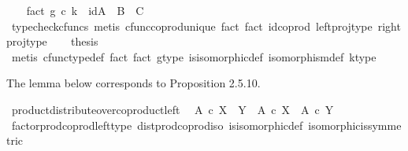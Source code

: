 \begin{isabellebody}
\ \ \isamarkupfalse%
\ fact{}{\isacharcolon}{\kern0pt}\ {\isachardoublequoteopen}{\isacharparenleft}{\kern0pt}g\ {\isasymcirc}\isactrlsub c\ k{\isacharparenright}{\kern0pt}\ {\isacharequal}{\kern0pt}\ id{\isacharparenleft}{\kern0pt}{\isacharparenleft}{\kern0pt}A\ {\isasymCoprod}\ B{\isacharparenright}{\kern0pt}\ {\isasymCoprod}\ C{\isacharparenright}{\kern0pt}{\isachardoublequoteclose}\isanewline
\ \ \ \ \isamarkupfalse%
\ {\isacharparenleft}{\kern0pt}typecheck{\isacharunderscore}{\kern0pt}cfuncs{\isacharcomma}{\kern0pt}\ metis\ cfunc{\isacharunderscore}{\kern0pt}coprod{\isacharunderscore}{\kern0pt}unique\ fact{}\ fact{}\ id{\isacharunderscore}{\kern0pt}coprod\ left{\isacharunderscore}{\kern0pt}proj{\isacharunderscore}{\kern0pt}type\ right{\isacharunderscore}{\kern0pt}proj{\isacharunderscore}{\kern0pt}type{\isacharparenright}{\kern0pt}\isanewline
\ \ \isamarkupfalse%
\ {\isacharquery}{\kern0pt}thesis\isanewline
\ \ \ \ \isamarkupfalse%
\ {\isacharparenleft}{\kern0pt}metis\ cfunc{\isacharunderscore}{\kern0pt}type{\isacharunderscore}{\kern0pt}def\ fact{}\ fact{}\ g{\isacharunderscore}{\kern0pt}type\ is{\isacharunderscore}{\kern0pt}isomorphic{\isacharunderscore}{\kern0pt}def\ isomorphism{\isacharunderscore}{\kern0pt}def\ k{\isacharunderscore}{\kern0pt}type{\isacharparenright}{\kern0pt}\isanewline
{}\isamarkupfalse%
%
\endisatagproof
{\isafoldproof}%
%
\isadelimproof
%
\endisadelimproof
%
\begin{isamarkuptext}%
The lemma below corresponds to Proposition 2.5.10.%
\end{isamarkuptext}\isamarkuptrue%
\isamarkupfalse%
\ product{\isacharunderscore}{\kern0pt}distribute{\isacharunderscore}{\kern0pt}over{\isacharunderscore}{\kern0pt}coproduct{\isacharunderscore}{\kern0pt}left{\isacharcolon}{\kern0pt}\isanewline
\ \ {\isachardoublequoteopen}A\ {\isasymtimes}\isactrlsub c\ {\isacharparenleft}{\kern0pt}X\ {\isasymCoprod}\ Y{\isacharparenright}{\kern0pt}\ {\isasymcong}\ {\isacharparenleft}{\kern0pt}A\ {\isasymtimes}\isactrlsub c\ X{\isacharparenright}{\kern0pt}\ {\isasymCoprod}\ {\isacharparenleft}{\kern0pt}A\ {\isasymtimes}\isactrlsub c\ Y{\isacharparenright}{\kern0pt}{\isachardoublequoteclose}\isanewline
%
\isadelimproof
\ \ %
\endisadelimproof
%
\isatagproof
{}\isamarkupfalse%
\ factor{\isacharunderscore}{\kern0pt}prod{\isacharunderscore}{\kern0pt}coprod{\isacharunderscore}{\kern0pt}left{\isacharunderscore}{\kern0pt}type\ dist{\isacharunderscore}{\kern0pt}prod{\isacharunderscore}{\kern0pt}coprod{\isacharunderscore}{\kern0pt}iso\ is{\isacharunderscore}{\kern0pt}isomorphic{\isacharunderscore}{\kern0pt}def\ isomorphic{\isacharunderscore}{\kern0pt}is{\isacharunderscore}{\kern0pt}symmetric\ \isamarkupfalse%

\end{isabellebody}
